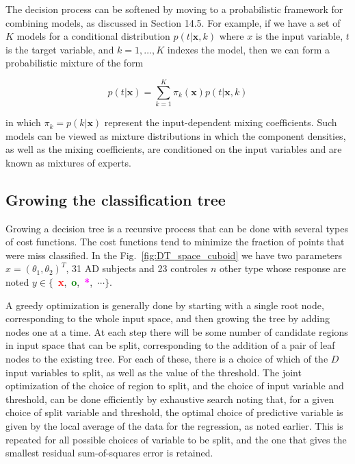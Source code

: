 \documentclass[final, paper=letter,5p,times,twocolumn]{elsarticle}
\begin{document}
The decision process can be softened by moving to a probabilistic framework for combining models, as discussed in Section 14.5. For example, if we have a set of $K$ models for a conditional distribution $p(t|\bm{x}, k)$ where $x$ is the input variable, $t$ is the target variable, and $k = 1, \dots , K$ indexes the model, then we can form a probabilistic mixture of the form

$$
p(t|\bm{x}) = \sum_{k=1}^{K} \pi_{k}(\bm{x})p(t|\bm{x},k)
$$

in which $ \pi_{k} = p(k|\bm{x})$ represent the input-dependent mixing coefficients. Such models can be viewed as mixture distributions in which the component densities, as well as the mixing coefficients, are conditioned on the input variables and are known as mixtures of experts. 

\subsection{Growing the classification tree}

Growing a decision tree is a recursive process that can be done with several types of cost functions. The cost functions tend to minimize the fraction of points that were miss classified. In the Fig.~\ref{fig:DT_space_cuboid} we have two parameters $x = (\theta_{1}, \theta_{2})^{T}$, 31 AD subjects and 23 controles $n$ other type whose response are noted $y \in \{$~{\bf\textcolor{red}{x}},~{\bf\textcolor{green}{o}},~{\bf\textcolor{magenta}{*}},~$\cdots\}$.

A greedy optimization is generally done by starting with a single root node, corresponding to the whole input space, and then growing the tree by adding nodes one at a time. At each step there will be some number of candidate regions in input space that can be split, corresponding to the addition of a pair of leaf nodes to the existing tree. For each of these, there is a choice of which of the $D$ input variables to split, as well as the value of the threshold. The joint optimization of the choice of region to split, and the choice of input variable and threshold, can be done efficiently by exhaustive search noting that, for a given choice of split variable and threshold, the optimal choice of predictive variable is given by the local average of the data for the regression, as noted earlier. This is repeated for all possible choices of variable to be split, and the one that gives the smallest residual sum-of-squares error is retained.
\end{document}
